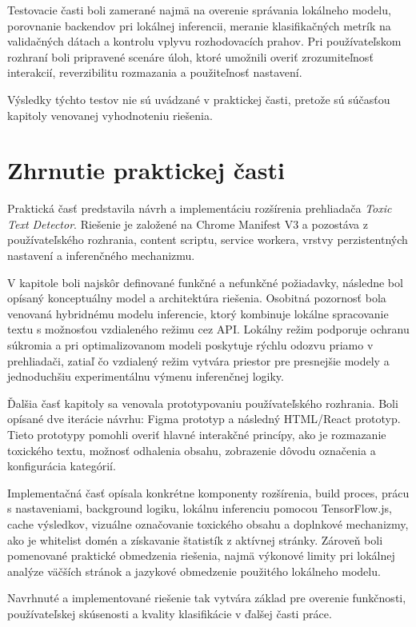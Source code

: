 Testovacie časti boli zamerané najmä na overenie správania lokálneho modelu, porovnanie backendov pri lokálnej inferencii, meranie klasifikačných metrík na validačných dátach a kontrolu vplyvu rozhodovacích prahov. Pri používateľskom rozhraní boli pripravené scenáre úloh, ktoré umožnili overiť zrozumiteľnosť interakcií, reverzibilitu rozmazania a použiteľnosť nastavení.

Výsledky týchto testov nie sú uvádzané v praktickej časti, pretože sú súčasťou kapitoly venovanej vyhodnoteniu riešenia.

\section{Zhrnutie praktickej časti}
Praktická časť predstavila návrh a implementáciu rozšírenia prehliadača \textit{Toxic Text Detector}. Riešenie je založené na Chrome Manifest V3 a pozostáva z používateľského rozhrania, content scriptu, service workera, vrstvy perzistentných nastavení a inferenčného mechanizmu.

V kapitole boli najskôr definované funkčné a nefunkčné požiadavky, následne bol opísaný konceptuálny model a architektúra riešenia. Osobitná pozornosť bola venovaná hybridnému modelu inferencie, ktorý kombinuje lokálne spracovanie textu s možnosťou vzdialeného režimu cez API. Lokálny režim podporuje ochranu súkromia a pri optimalizovanom modeli poskytuje rýchlu odozvu priamo v prehliadači, zatiaľ čo vzdialený režim vytvára priestor pre presnejšie modely a jednoduchšiu experimentálnu výmenu inferenčnej logiky.

Ďalšia časť kapitoly sa venovala prototypovaniu používateľského rozhrania. Boli opísané dve iterácie návrhu: Figma prototyp a následný HTML/React prototyp. Tieto prototypy pomohli overiť hlavné interakčné princípy, ako je rozmazanie toxického textu, možnosť odhalenia obsahu, zobrazenie dôvodu označenia a konfigurácia kategórií.

Implementačná časť opísala konkrétne komponenty rozšírenia, build proces, prácu s nastaveniami, background logiku, lokálnu inferenciu pomocou TensorFlow.js, cache výsledkov, vizuálne označovanie toxického obsahu a doplnkové mechanizmy, ako je whitelist domén a získavanie štatistík z aktívnej stránky. Zároveň boli pomenované praktické obmedzenia riešenia, najmä výkonové limity pri lokálnej analýze väčších stránok a jazykové obmedzenie použitého lokálneho modelu.

Navrhnuté a implementované riešenie tak vytvára základ pre overenie funkčnosti, používateľskej skúsenosti a kvality klasifikácie v ďalšej časti práce.